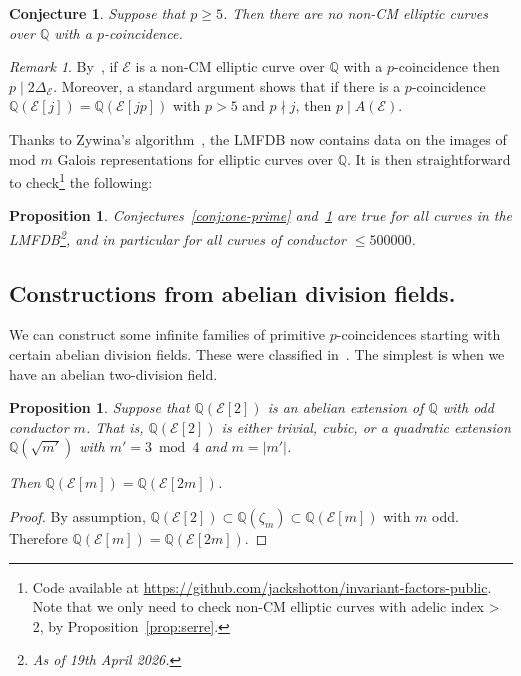 \documentclass{amsart}
\theoremstyle{plain}
\newtheorem{prop}[theorem]{Proposition}
\newtheorem{conj}[theorem]{Conjecture}
\theoremstyle{remark}
\newtheorem{rem}[theorem]{Remark}
\newcommand{\Q}{\mathbb{Q}}
\newcommand{\E}{\mathcal{E}}
\begin{document}
\begin{conj}\label{conj:coinc23} Suppose that $p \ge 5$. Then there are no non-CM elliptic curves over $\Q$ with a $p$-coincidence.
\end{conj}

\begin{rem}\label{rem:yvon} By~\cite[Corollary~3.10]{yvonCoincidencesDivisionFields2025}, if $\E$ is a non-CM elliptic curve over $\Q$
  with a $p$-coincidence then $p \mid 2 \Delta_\E$. Moreover, a standard argument shows that if there is a
  $p$-coincidence $\Q(\E[j]) = \Q(\E[jp])$ with $p > 5$ and $p \nmid j$, then $p \mid A(\E)$.
\end{rem}

Thanks to Zywina's algorithm~\cite{zywinaExplicitOpenImages2024}, the LMFDB now contains data on the images of mod $m$
Galois representations for elliptic curves over $\Q$. It is then straightforward to check\footnote{Code available at
  \url{https://github.com/jackshotton/invariant-factors-public}. Note that we only need to check non-CM elliptic curves
  with adelic index > 2, by Proposition~\ref{prop:serre}.} the following:

\begin{prop} Conjectures~\ref{conj:one-prime} and~\ref{conj:coinc23} are true for all curves in the
  LMFDB\footnote{As of 19th April 2026.}, and in particular for all curves of conductor $\le 500000$.
\end{prop}

\subsection{Constructions from abelian division fields.}
\label{sec:abelian}

We can construct some infinite families of primitive $p$-coincidences starting with certain abelian division fields. These
were classified in~\cite{gonzalez-jimenezEllipticCurvesAbelian2016}. The simplest is when we have an abelian
two-division field.

\begin{prop}\label{prop:ab-two-torsion}
  Suppose that $\Q(\E[2])$ is an abelian extension of $\Q$ with odd conductor $m$. That is, $\Q(\E[2])$ is either
  trivial, cubic, or a quadratic extension $\Q(\sqrt{m'})$ with $m' = 3 \bmod 4$ and $m = |m'|$.
    
    Then $\Q(\E[m]) = \Q(\E[2m])$.
\end{prop}
\begin{proof}
    By assumption, $\Q(\E[2]) \subset \Q(\zeta_m)\subset \Q(\E[m])$ with $m$ odd. Therefore $\Q(\E[m])=\Q(\E[2m])$.
\end{proof}
\end{document}
